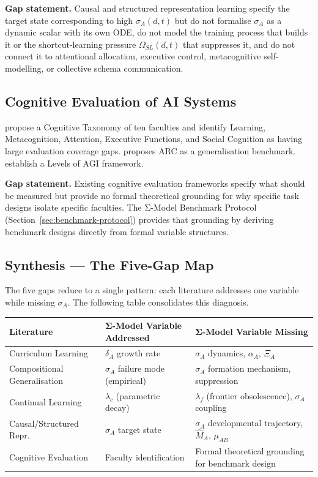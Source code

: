 \documentclass[10pt]{article}
\begin{document}
\textbf{Gap statement.} Causal and structured representation learning
specify the target state corresponding to high $\sigma_A(d,t)$ but do
not formalise $\sigma_A$ as a dynamic scalar with its own ODE, do not
model the training process that builds it or the shortcut-learning pressure
$\Omega_{SL}(d,t)$ \citep{geirhos2020shortcutlearning} that suppresses it, and do not connect it to
attentional allocation, executive control, metacognitive self-modelling,
or collective schema communication.

\subsection{Cognitive Evaluation of AI Systems}\label{sec:cognitive-eval}

\cite{burnell2026measuringprogressagi} propose a Cognitive Taxonomy of
ten faculties and identify Learning, Metacognition, Attention, Executive
Functions, and Social Cognition as having large evaluation coverage gaps.
\cite{chollet2019measureintelligence} proposes ARC as a generalisation
benchmark. \cite{morris2024levelsagi} establish a Levels of AGI framework.

\textbf{Gap statement.} Existing cognitive evaluation frameworks specify
what should be measured but provide no formal theoretical grounding for
why specific task designs isolate specific faculties. The Σ-Model Benchmark
Protocol (Section~\ref{sec:benchmark-protocol}) provides that grounding
by deriving benchmark designs directly from formal variable structures.

\subsection{Synthesis --- The Five-Gap Map}\label{sec:five-gap-map}

The five gaps reduce to a single pattern: each literature addresses
one variable while missing $\sigma_A$. The following table consolidates
this diagnosis.

\begin{center}
\renewcommand{\arraystretch}{1.3}
\begin{tabular}{>{\raggedright}p{3.5cm} >{\raggedright}p{3.5cm} >{\raggedright\arraybackslash}p{6.5cm}}
\toprule
\textbf{Literature} & \textbf{Σ-Model Variable Addressed} & \textbf{Σ-Model Variable Missing} \\
\midrule
Curriculum Learning & $\delta_A$ growth rate & $\sigma_A$ dynamics, $\alpha_A$, $\Xi_A$ \\
Compositional Generalisation & $\sigma_A$ failure mode (empirical) & $\sigma_A$ formation mechanism, suppression \\
Continual Learning & $\lambda_c$ (parametric decay) & $\lambda_f$ (frontier obsolescence), $\sigma_A$ coupling \\
Causal/Structured Repr. & $\sigma_A$ target state & $\sigma_A$ developmental trajectory, $\hat{M}_A$, $\mu_{AB}$ \\
Cognitive Evaluation & Faculty identification & Formal theoretical grounding for benchmark design \\
\bottomrule
\end{tabular}
\end{center}
\end{document}
